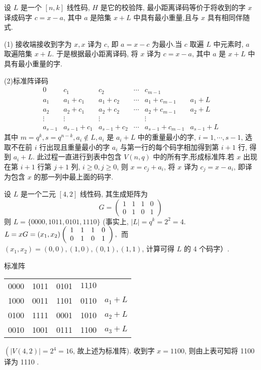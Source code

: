 \begin{theorem}
 设 $ L $ 是一个 $ [n, k] $ 线性码, $ H $ 是它的校验阵, 最小距离译码等价于将收到的字 $ x $ 译成码字 $ c=x-a $, 其中 $ a $ 是陪集 $ x+L $ 中具有最小重量,且与 $ x $ 具有相同伴随式.
\end{theorem}
\begin{remark}
    (1) 接收端接收到字为 $ x, x $ 译为 $ c $, 即 $ a=x-c $ 为最小.当 $ c $ 取遍 $ L $ 中元素时, $ a $ 取遍陪集 $ x+L $. 于是根据最小距离译码, 将 $ x $ 译为 $ c=x-a $, 其中 $ a $ 是 $ x+L $ 中具有最小重量的字.

    (2)标准阵译码
$$
\begin{array}{cccccc}
0 & c_{1} & c_{2} & \cdots & c_{m-1} & \\
a_{1} & a_{1}+c_{1} & a_{1}+c_{2} & \cdots & a_{1}+c_{m-1} & a_{1}+L \\
a_{2} & a_{2}+c_{1} & a_{2}+c_{2} & \cdots & a_{2}+c_{m-1} & a_{2}+L \\
\vdots & \vdots & \vdots & & \vdots & \\
a_{s-1} & a_{s-1}+c_{1} & a_{s-1}+c_{2} & \cdots & a_{s-1}+c_{m-1} & a_{s-1}+L
\end{array}
$$
其中 $ m=q^{k}, s=q^{n-k}, a_{i} \notin L, a_{i} $ 是 $ a_{i}+L $ 中的重量最小的字, $ i=1, \cdots, s-1 $, 选取不在前 $ i $ 行出现且重量最小的字 $ a_{i} $ 与第一行的每个码字相加得到第 $ i+1 $ 行, 得到 $ a_{i}+L $.
此过程一直进行到表中包含 $ V(n, q) $ 中的所有字,形成标准阵.若 $ x $ 出现在第 $ i+1 $ 行第 $ j+1 $ 列, $ i \geq 0, j \geq 0 $, 则 $ x=c_{j}+a_{i} $, 将 $ x $ 译为 $ c_{j}=x-a_{i} $, 即译为包含 $ x $ 的那一列中最上面的码字.
\end{remark}

\begin{example}
 设 $ L $ 是一个二元 $ [4,2] $ 线性码, 其生成矩阵为
$$
G=\left(\begin{array}{llll}
1 & 1 & 1 & 0 \\
0 & 1 & 0 & 1
\end{array}\right)
$$
则 $ L=\{0000,1011,0101,1110\} $
(事实上, $ |L|=q^{k}=2^{2}=4 $.
$
L=x G=\left(x_{1}, x_{2}\right)\left(\begin{array}{llll}
1 & 1 & 1 & 0 \\
0 & 1 & 0 & 1
\end{array}\right), \\$
 而 $\left(x_{1}, x_{2}\right)=(0,0),(1,0),(0,1),(1,1)$,
计算可得 $ L $ 的 4 个码字）.

标准阵
\begin{center}
\begin{tabular}{lllll}
0000 & 1011 & 0101 & $ \underline{1110} $ & \\
1000 & 0011 & 1101 & 0110 & $ a_{1}+L $ \\
0100 & 1111 & 0001 & 1010 & $ a_{2}+L $ \\
0010 & 1001 & 0111 & 1100 & $ a_{3}+L $
\end{tabular}
\end{center}
$ \left(|V(4,2)|=2^{4}=16\right. $, 故上述为标准阵).
收到字 $ x=1100 $, 则由上表可知将 1100 译为 1110 .
\end{example}

